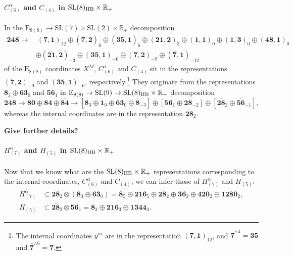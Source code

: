 \documentclass[11pt]{article}
\newcommand{\SL}{\ensuremath{\mathrm{SL}}\xspace}
\newcommand{\E}{\ensuremath{\mathrm{E}}\xspace}
\newcommand{\R}{\ensuremath{\mathbb{R}}\xspace}
\newcommand{\ce}[1]{\marginpar{\parbox{\marginparwidth}{\boldmath $\Longleftarrow$}}
{\boldmath\bfseries #1}}
\begin{document}
\paragraph{\boldmath $C_{(6)}^{\alpha}$ and $C_{(4)}$ in $\SL(8)_{\rm IIB}\times\R_{+}$} In the $\E_{8(8)}\rightarrow\SL(7)\times\SL(2)\times\R_{+}$ decomposition
\begin{equation}
  \begin{aligned}
    \bm{248} \longrightarrow & \ (\bm{7},\bm{1})_{12} \oplus (\bm{\bar{7}},\bm{2})_{6} \oplus (\bm{\bar{35}},\bm{1})_{6} \oplus (\bm{21},\bm{2})_{3} \oplus (\bm{1},\bm{1})_{0} \oplus (\bm{1},\bm{3})_{0} \oplus (\bm{48},\bm{1})_{0} \\
    & \oplus (\bm{\bar{21}},\bm{2})_{-3} \oplus (\bm{35},\bm{1})_{-6} \oplus (\bm{7},\bm{2})_{-9} \oplus (\bm{\bar{7}},\bm{1})_{-12}
  \end{aligned} 
\end{equation}
of the $\E_{8(8)}$ coordinates $X^{M}$, $C_{(6)}^{\alpha}$ and $C_{(4)}$ sit in the representations $(\bm{7},\bm{2})_{-9}$ and $(\bm{35},\bm{1})_{-6}$, respectively.\footnote{The internal coordinates $y^{m}$ are in the representation $(\bm{7},\bm{1})_{12}$, and $\bm{\bar{7}}^{\wedge 4}=\bm{35}$ and $\bm{\bar{7}}^{\wedge 6}=\bm{7}$.} They originate from the representations $\bm{8}_{3}\oplus\bm{63}_{0}$ and $\bm{56}_{1}$ in $\E_{8(8)}\rightarrow\SL(9)\rightarrow\SL(8)_{\rm IIB}\times\R_{+}$ decomposition
\begin{equation}
  \bm{248} \longrightarrow \bm{80} \oplus \bm{84} \oplus \bm{\bar{84}} \longrightarrow \left[\bm{8}_{3} \oplus \bm{1}_{0} \oplus \bm{63}_{0} \oplus \bm{\bar{8}}_{-3}\right] \oplus \left[\bm{56}_{1} \oplus \bm{28}_{-2}\right] \oplus \left[\bm{\bar{28}}_{2} \oplus \bm{\bar{56}}_{-1}\right],
\end{equation}
whereas the internal coordinates are in the representation $\bm{\bar{28}}_{2}$.

\ce{Give further details?}

\paragraph{\boldmath $H_{(7)}^{\alpha}$ and $H_{(5)}$ in $\SL(8)_{\rm IIB}\times\R_{+}$} Now that we know what are the $\SL(8)_{\rm IIB}\times\R_{+}$ representations corresponding to the internal coordinates, $C_{(6)}^{\alpha}$ and $C_{(4)}$, we can infer those of $H_{(7)}^{\alpha}$ and $H_{(5)}$:
\begin{equation}  \label{eq:H7H5inIIB}
  \begin{aligned}
    H_{(7)}^{\alpha} & \subset \bm{\bar{28}}_{2} \otimes \left(\bm{8}_{3}\oplus\bm{63}_{0}\right) = \bm{\bar{8}}_{5} \oplus \bm{\bar{216}}_{5} \oplus \bm{\bar{28}}_{2} \oplus \bm{\bar{36}}_{2} \oplus \bm{\bar{420}}_{2} \oplus \bm{\bar{1280}}_{2}, \\
    H_{(5)} & \subset \bm{\bar{28}}_{2} \otimes \bm{56}_{1} = \bm{8}_{3} \oplus \bm{216}_{3} \oplus \bm{1344}_{3}.
  \end{aligned}
\end{equation}
\end{document}
